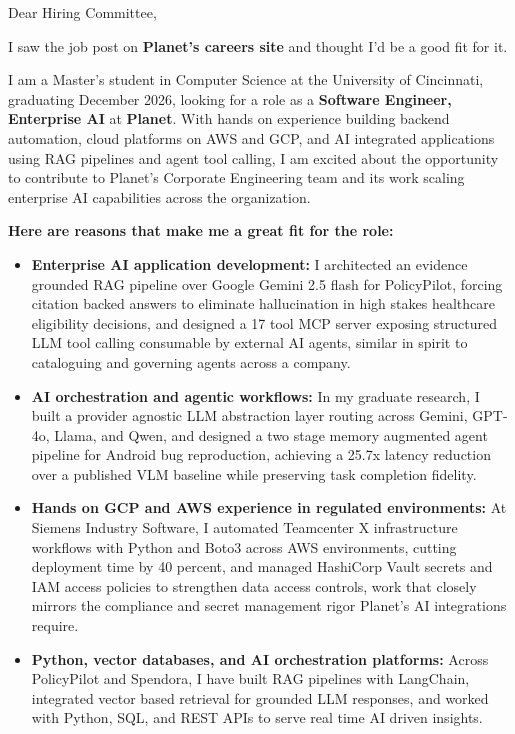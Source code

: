 \documentclass[11pt]{letter}
\date{}
\begin{document}
\begin{letter}{}

\opening{Dear Hiring Committee,}

I saw the job post on \textbf{Planet's careers site} and thought I'd be a good fit for it.

I am a Master's student in Computer Science at the University of Cincinnati, graduating December 2026, looking for a role as a \textbf{Software Engineer, Enterprise AI} at \textbf{Planet}. With hands on experience building backend automation, cloud platforms on AWS and GCP, and AI integrated applications using RAG pipelines and agent tool calling, I am excited about the opportunity to contribute to Planet's Corporate Engineering team and its work scaling enterprise AI capabilities across the organization.

\textbf{Here are reasons that make me a great fit for the role:}

\begin{itemize}[leftmargin=*, itemsep=0.45em]
    \item \textbf{Enterprise AI application development:} I architected an evidence grounded RAG pipeline over Google Gemini 2.5 flash for PolicyPilot, forcing citation backed answers to eliminate hallucination in high stakes healthcare eligibility decisions, and designed a 17 tool MCP server exposing structured LLM tool calling consumable by external AI agents, similar in spirit to cataloguing and governing agents across a company.

    \item \textbf{AI orchestration and agentic workflows:} In my graduate research, I built a provider agnostic LLM abstraction layer routing across Gemini, GPT-4o, Llama, and Qwen, and designed a two stage memory augmented agent pipeline for Android bug reproduction, achieving a 25.7x latency reduction over a published VLM baseline while preserving task completion fidelity.

    \item \textbf{Hands on GCP and AWS experience in regulated environments:} At Siemens Industry Software, I automated Teamcenter X infrastructure workflows with Python and Boto3 across AWS environments, cutting deployment time by 40 percent, and managed HashiCorp Vault secrets and IAM access policies to strengthen data access controls, work that closely mirrors the compliance and secret management rigor Planet's AI integrations require.

    \item \textbf{Python, vector databases, and AI orchestration platforms:} Across PolicyPilot and Spendora, I have built RAG pipelines with LangChain, integrated vector based retrieval for grounded LLM responses, and worked with Python, SQL, and REST APIs to serve real time AI driven insights.


\end{itemize}
\end{letter}
\end{document}
